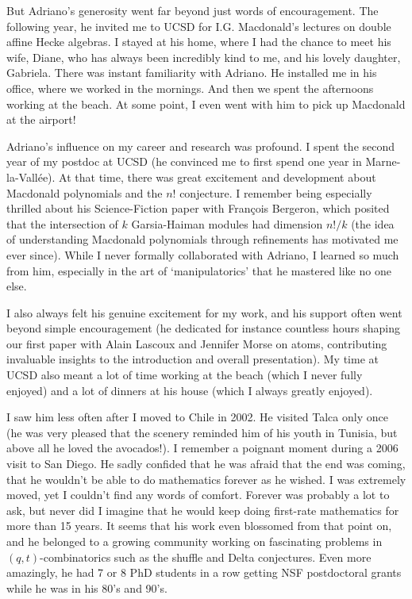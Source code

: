 \documentclass{notices}
\begin{document}
But Adriano's generosity went far beyond just words of encouragement. The following year, he invited me to UCSD for I.G. Macdonald's lectures on double affine Hecke algebras. I stayed at his home, where I had the chance to meet his wife, Diane, who has always been incredibly kind to me, and his lovely daughter, Gabriela.  There was instant familiarity with Adriano.  He installed me in his office, where we worked in the mornings. And then we spent the afternoons working at the beach.  At some point, I even went with him to pick up Macdonald at the airport!  

Adriano's influence on my career and research was profound. I spent the second year of my postdoc at UCSD (he convinced me to first spend one year in Marne-la-Vallée). At that time, there was great excitement and development about Macdonald polynomials and  the $n!$ conjecture. I remember being especially thrilled about his Science-Fiction paper with Fran\c{c}ois Bergeron, which posited that the intersection of $k$ Garsia-Haiman modules had dimension $n!/k$ (the idea of understanding Macdonald polynomials through refinements has motivated me ever since). While I never formally collaborated with Adriano, I learned so much from him, especially in the art of `manipulatorics' that he mastered like no one else. 

I also always felt his genuine excitement for my work, and  his support often went beyond simple encouragement (he dedicated for instance countless hours shaping our first paper with Alain Lascoux and Jennifer Morse on atoms, contributing invaluable insights to the introduction and overall presentation). My time at UCSD also meant a lot of time working at the beach (which I never fully enjoyed) and a lot of dinners at his house (which I always greatly enjoyed).

I saw him less often after I moved to Chile in 2002.  He visited Talca only once (he was very pleased that the scenery reminded him of his youth in Tunisia, but above all he loved the avocados!). I remember a poignant moment during a 2006 visit to San Diego. He sadly confided that he was afraid that the end was coming, that he wouldn't be able to do mathematics forever as he wished. I was extremely moved, yet I couldn't find any words of comfort. Forever was probably a lot to ask, but never did I imagine that he would keep doing first-rate mathematics for more than 15 years.  It seems that his work  even blossomed from that point on, and he belonged to a growing community working on fascinating problems in $(q,t)$-combinatorics such as the shuffle and Delta conjectures. Even more amazingly, he had 7 or 8 PhD students in a row getting NSF postdoctoral grants while he was in his 80's and 90's.
\end{document}

